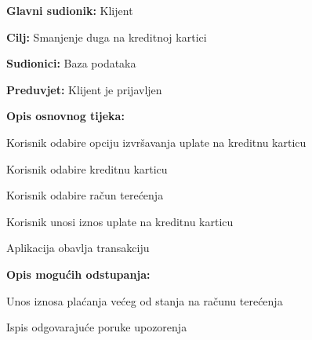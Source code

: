     	 
    		\noindent {}
    	\begin{packed_item}
    		
    		\item \textbf{Glavni sudionik: }Klijent
    		\item  \textbf{Cilj:} Smanjenje duga na kreditnoj kartici
    		\item  \textbf{Sudionici:} Baza podataka
    		\item  \textbf{Preduvjet:} Klijent je prijavljen
    		\item  \textbf{Opis osnovnog tijeka:}
    		
    		\item[] \begin{packed_enum}
    			
    			\item Korisnik odabire opciju izvršavanja uplate na kreditnu karticu
    			\item Korisnik odabire kreditnu karticu
    			\item Korisnik odabire račun terećenja
    			\item Korisnik unosi iznos uplate na kreditnu karticu
    			\item Aplikacija obavlja transakciju 
    			
    			
    			
    		\end{packed_enum}
    		
    	\item  \textbf{Opis mogućih odstupanja:}
    	
    	\item[] \begin{packed_item}
    		
    		\item[3.a] Unos iznosa plaćanja većeg od stanja na računu terećenja
    		\item[] \begin{packed_enum}
    			
    			\item Ispis odgovarajuće poruke upozorenja
    			
    			
    		\end{packed_enum}
    		
    		
    	\end{packed_item}
    		
    	\end{packed_item}
    		
